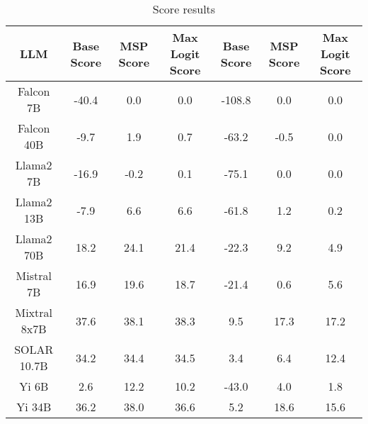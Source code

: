 \renewcommand\arraystretch{1.2}
\begin{table*}
\centering
\begin{tabular}{c|c|c|c|c|c|c}
LLM & Base Score & MSP Score & Max Logit Score & Base Score & MSP Score & Max Logit Score\\ \hline
Falcon 7B & -40.4 & 0.0 & 0.0 & -108.8 & 0.0 & 0.0\\
Falcon 40B & -9.7 & 1.9 & 0.7 & -63.2 & -0.5 & 0.0\\
Llama2 7B & -16.9 & -0.2 & 0.1 & -75.1 & 0.0 & 0.0\\
Llama2 13B & -7.9 & 6.6 & 6.6 & -61.8 & 1.2 & 0.2\\
Llama2 70B & 18.2 & 24.1 & 21.4 & -22.3 & 9.2 & 4.9\\
Mistral 7B & 16.9 & 19.6 & 18.7 & -21.4 & 0.6 & 5.6\\
Mixtral 8x7B & 37.6 & 38.1 & 38.3 & 9.5 & 17.3 & 17.2\\
SOLAR 10.7B & 34.2 & 34.4 & 34.5 & 3.4 & 6.4 & 12.4\\
Yi 6B & 2.6 & 12.2 & 10.2 & -43.0 & 4.0 & 1.8\\
Yi 34B & 36.2 & 38.0 & 36.6 & 5.2 & 18.6 & 15.6\\
\hline
\end{tabular}
\caption{Score results}
\end{table*}
\label{tab:score}

